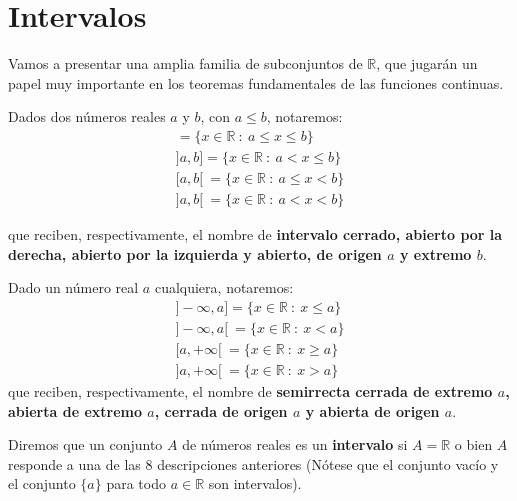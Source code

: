 
\section{Intervalos}
Vamos a presentar una amplia familia de subconjuntos de $\mathbb{R}$, que jugarán un papel muy importante en los teoremas fundamentales de las funciones continuas.
\begin{notacion}
    Dados dos números reales $a$ y $b$, con $a \leq b$, notaremos:
    \begin{gather*}
        [a,b] = \{x \in \mathbb{R} ~:~ a \leq x \leq b\}\\
        ]a,b]= \{x \in \mathbb{R} ~:~ a < x \leq b\}\\
        [a,b[ ~ = \{x \in \mathbb{R} ~:~ a \leq x < b\}\\
        ]a,b[ ~ = \{x \in \mathbb{R} ~:~ a < x < b\}
    \end{gather*}

    que reciben, respectivamente, el nombre de \textbf{intervalo cerrado, abierto por la derecha, abierto por la izquierda y abierto, de origen $a$ y extremo $b$}.
\end{notacion}

\begin{notacion}
    Dado un número real $a$ cualquiera, notaremos:
    \begin{gather*}
        ]-\infty, a] = \{x \in \mathbb{R} ~:~ x \leq a\}\\
        ]-\infty, a[ ~ = \{x \in \mathbb{R} ~:~ x < a\}\\
        [a, +\infty[ ~ = \{x \in \mathbb{R} ~:~ x \geq a\}\\
        ]a, +\infty[ ~ = \{x \in \mathbb{R} ~:~ x > a\}
    \end{gather*}
    que reciben, respectivamente, el nombre de \textbf{semirrecta cerrada de extremo $a$, abierta de extremo $a$, cerrada de origen $a$ y abierta de origen $a$}.
\end{notacion}

\begin{definicion}
    Diremos que un conjunto $A$ de números reales es un \textbf{intervalo} si $A = \mathbb{R}$ o bien $A$ responde a una de las $8$ descripciones anteriores (Nótese que el conjunto vacío y el conjunto $\{a\}$ para todo $a \in \mathbb{R}$ son intervalos).
\end{definicion}

